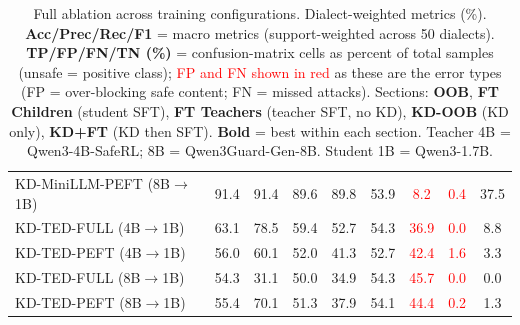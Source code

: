 \begin{table}[t]
\begin{tabular}{lcccccccc}
KD-MiniLLM-PEFT (8B$\rightarrow$1B)        & 91.4 & 91.4 & 89.6 & 89.8 & 53.9 & \textcolor{red}{8.2} & \textcolor{red}{0.4} & 37.5 \\
KD-TED-FULL (4B$\rightarrow$1B)            & 63.1 & 78.5 & 59.4 & 52.7 & 54.3 & \textcolor{red}{36.9} & \textcolor{red}{0.0} & 8.8 \\
KD-TED-PEFT (4B$\rightarrow$1B)            & 56.0 & 60.1 & 52.0 & 41.3 & 52.7 & \textcolor{red}{42.4} & \textcolor{red}{1.6} & 3.3 \\
KD-TED-FULL (8B$\rightarrow$1B)            & 54.3 & 31.1 & 50.0 & 34.9 & 54.3 & \textcolor{red}{45.7} & \textcolor{red}{0.0} & 0.0 \\
KD-TED-PEFT (8B$\rightarrow$1B)            & 55.4 & 70.1 & 51.3 & 37.9 & 54.1 & \textcolor{red}{44.4} & \textcolor{red}{0.2} & 1.3 \\
\bottomrule
\end{tabular}
\caption{Full ablation across training configurations. Dialect-weighted metrics (\%). \textbf{Acc/Prec/Rec/F1} = macro metrics (support-weighted across 50 dialects). \textbf{TP/FP/FN/TN (\%)} = confusion-matrix cells as percent of total samples (unsafe = positive class); \textcolor{red}{FP and FN shown in red} as these are the error types (FP = over-blocking safe content; FN = missed attacks). Sections: \textbf{OOB}, \textbf{FT Children} (student SFT), \textbf{FT Teachers} (teacher SFT, no KD), \textbf{KD-OOB} (KD only), \textbf{KD+FT} (KD then SFT). \textbf{Bold} = best within each section. Teacher 4B = Qwen3-4B-SafeRL; 8B = Qwen3Guard-Gen-8B. Student 1B = Qwen3-1.7B.}
\label{tab:ablation_full}
\end{table}
